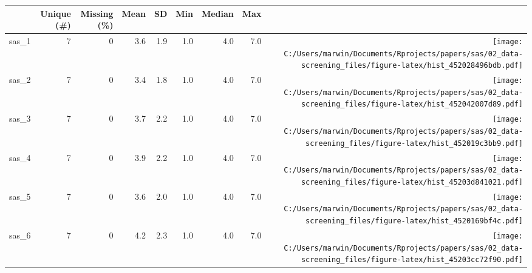 \documentclass[
  letterpaper,
  DIV=11,
  numbers=noendperiod]{scrreprt}
\begin{document}
\begin{table}
\centering
\begin{tabular}[t]{lrrrrrrr>{}r}
\toprule
  & Unique (\#) & Missing (\%) & Mean & SD & Min & Median & Max &   \\
\midrule
sas\_1 & 7 & 0 & \num{3.6} & \num{1.9} & \num{1.0} & \num{4.0} & \num{7.0} & \texttt{[image: C:/Users/marwin/Documents/Rprojects/papers/sas/02\_data-screening\_files/figure-latex/hist\_452028496bdb.pdf]}\\
sas\_2 & 7 & 0 & \num{3.4} & \num{1.8} & \num{1.0} & \num{4.0} & \num{7.0} & \texttt{[image: C:/Users/marwin/Documents/Rprojects/papers/sas/02\_data-screening\_files/figure-latex/hist\_452042007d89.pdf]}\\
sas\_3 & 7 & 0 & \num{3.7} & \num{2.2} & \num{1.0} & \num{4.0} & \num{7.0} & \texttt{[image: C:/Users/marwin/Documents/Rprojects/papers/sas/02\_data-screening\_files/figure-latex/hist\_452019c3bb9.pdf]}\\
sas\_4 & 7 & 0 & \num{3.9} & \num{2.2} & \num{1.0} & \num{4.0} & \num{7.0} & \texttt{[image: C:/Users/marwin/Documents/Rprojects/papers/sas/02\_data-screening\_files/figure-latex/hist\_45203d841021.pdf]}\\
sas\_5 & 7 & 0 & \num{3.6} & \num{2.0} & \num{1.0} & \num{4.0} & \num{7.0} & \texttt{[image: C:/Users/marwin/Documents/Rprojects/papers/sas/02\_data-screening\_files/figure-latex/hist\_4520169bf4c.pdf]}\\
sas\_6 & 7 & 0 & \num{4.2} & \num{2.3} & \num{1.0} & \num{4.0} & \num{7.0} & \texttt{[image: C:/Users/marwin/Documents/Rprojects/papers/sas/02\_data-screening\_files/figure-latex/hist\_45203cc72f90.pdf]}\\
\bottomrule
\end{tabular}
\end{table}
\end{document}
